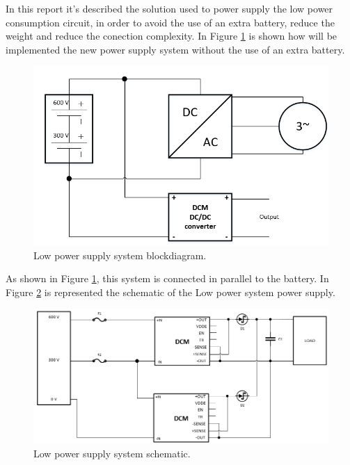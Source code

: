 In this report it's described the solution used to power supply the low power consumption circuit, in order to avoid the use of an extra battery, reduce the weight and reduce the conection complexity. In Figure \ref{fig:low_power_supply} is shown how will be implemented the new power supply system without the use of an extra battery.\par
\begin{figure}[!htb]
	\centering
	\includegraphics[scale=0.5]{Figures/Power_Supply_diagram2.png}
	\caption{Low power supply system blockdiagram.}
	\label{fig:low_power_supply}
\end{figure}
As shown in Figure \ref{fig:low_power_supply}, this system is connected in parallel to the battery. In Figure \ref{fig:low_power_schematic} is represented the schematic of the Low power system power supply.
\begin{figure}[!htb]
	\centering
	\includegraphics[scale=0.5]{Figures/Power_Supply_diagram.png}
	\caption{Low power supply system schematic.}
	\label{fig:low_power_schematic}
\end{figure}
